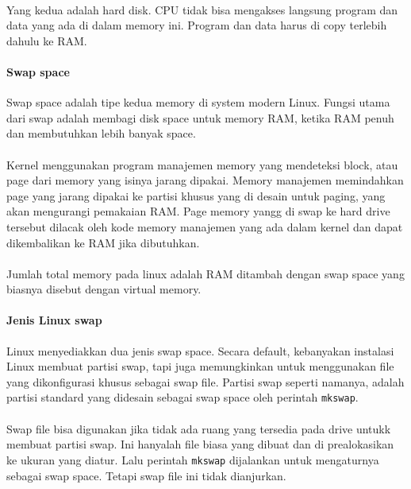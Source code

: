 \documentclass[a4paper,12pt]{article}
\begin{document}
\paragraph{}
Yang kedua adalah hard disk. CPU tidak bisa mengakses langsung program dan data yang ada di dalam memory ini. Program dan data harus di copy terlebih dahulu ke RAM.

\paragraph{Swap space\\}
Swap space adalah tipe kedua memory di system modern Linux. Fungsi utama dari swap adalah membagi disk space untuk memory RAM, ketika RAM penuh dan membutuhkan lebih banyak space.

\paragraph{}
Kernel menggunakan program manajemen memory yang mendeteksi block, atau page dari memory yang isinya jarang dipakai. Memory manajemen memindahkan page yang jarang dipakai ke partisi khusus yang di desain untuk paging, yang akan mengurangi pemakaian RAM. Page memory yangg di swap ke hard drive tersebut dilacak oleh kode memory manajemen yang ada dalam kernel dan dapat dikembalikan ke RAM jika dibutuhkan.

\paragraph{}
Jumlah total memory pada linux adalah RAM ditambah dengan swap space yang biasnya disebut dengan virtual memory.

\paragraph{Jenis Linux swap\\}
Linux menyediakkan dua jenis swap space. Secara default, kebanyakan instalasi Linux membuat partisi swap, tapi juga memungkinkan untuk menggunakan file yang dikonfigurasi khusus sebagai swap file. Partisi swap seperti namanya, adalah partisi standard yang didesain sebagai swap space oleh perintah \texttt{mkswap}.

\paragraph{}
Swap file bisa digunakan jika tidak ada ruang yang tersedia pada drive untukk membuat partisi swap. Ini hanyalah file biasa yang dibuat dan di prealokasikan ke ukuran yang diatur. Lalu perintah \texttt{mkswap} dijalankan untuk mengaturnya sebagai swap space. Tetapi swap file ini tidak dianjurkan.
\end{document}
